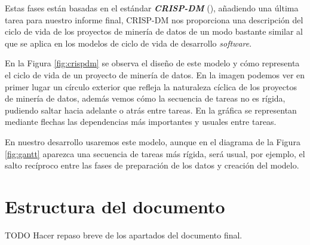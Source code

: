 Estas fases están basadas en el estándar \textbf{\textit{CRISP-DM}} (\cite{crispdm}), añadiendo una última tarea para nuestro informe final, CRISP-DM nos proporciona una descripción del ciclo de vida de los proyectos de minería de datos de un modo bastante similar al que se aplica en los modelos de ciclo de vida de desarrollo \textit{software}.


 

En la Figura \ref{fig:crispdm} se observa el diseño de este modelo y cómo representa el ciclo de vida de un proyecto de minería de datos. En la imagen podemos ver en primer lugar un círculo exterior que refleja la naturaleza cíclica de los proyectos de minería de datos, además vemos cómo la secuencia de tareas no es rígida, pudiendo saltar hacia adelante o atrás entre tareas. En la gráfica se representan mediante flechas las dependencias más importantes y usuales entre tareas.

En nuestro desarrollo usaremos este modelo, aunque en el diagrama de la Figura \ref{fig:gantt} aparezca una secuencia de tareas más rígida, será usual, por ejemplo, el salto recíproco entre las fases de preparación de los datos y creación del modelo.


\section{Estructura del documento}
\label{section:intro:estructura}
TODO Hacer repaso breve de los apartados del documento final.
